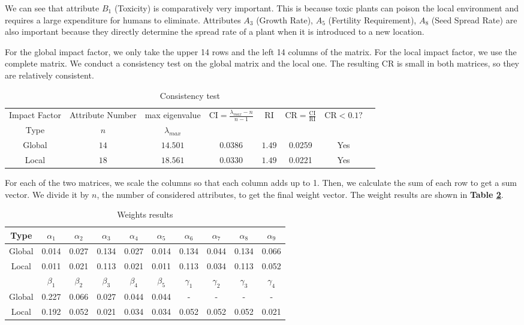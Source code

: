 \documentclass[12pt]{article}
\begin{document}
		We can see that attribute $B_1$ (Toxicity) is comparatively very important.  This is because toxic plants can poison the local environment and requires a large expenditure for humans to eliminate.  Attributes $A_3$ (Growth Rate), $A_5$ (Fertility Requirement), $A_8$ (Seed Spread Rate) are also important because they directly determine the spread rate of a plant when it is introduced to a new location.  
		
		For the global impact factor, we only take the upper 14 rows and the left 14 columns of the matrix.  For the local impact factor, we use the complete matrix.  We conduct a consistency test on the global matrix and the local one.  The resulting CR is small in both matrices, so they are relatively consistent.
		
		{
			\fontsize{10}{14}\selectfont
			{
				\begin{longtable}{cccccccc}
					\caption{Consistency test}
					\label{tb:consistency}\\
					
					\toprule
					Impact Factor&Attribute Number&max eigenvalue 
					&\multirow{2}{*}{$\mathrm{CI}=\frac{\lambda_{max}-n}{n-1}$}
					&\multirow{2}{*}{$\mathrm{RI}$}
					&\multirow{2}{*}{$\mathrm{CR}=\frac{\mathrm{CI}}{\mathrm{RI}}$}
					&\multirow{2}{*}{$\mathrm{CR}<0.1?$}\\
					Type&$n$&$\lambda_{max}$\\
					\toprule
					Global&$14$&$14.501$&$0.0386$&$1.49$&0.0259&Yes\\
					Local&$18$&$18.561$&$0.0330$&$1.49$&0.0221&Yes\\
					\bottomrule
				\end{longtable}
			}
		}	
		
		For each of the two matrices, we scale the columns so that each column adds up to 1.  Then, we calculate the sum of each row to get a sum vector.  We divide it by $n$, the number of considered attributes, to get the final weight vector.  The weight results are shown in \textbf{Table \ref{tb:weights}}.
	
		{
			\fontsize{10}{14}\selectfont
			{
				\begin{longtable}{c|ccccccccc}
					\caption{Weights results}
					\label{tb:weights}\\
					
					\toprule
					Type&$\alpha_1$&$\alpha_2$&$\alpha_3$&$\alpha_4$&$\alpha_5$&$\alpha_6$&$\alpha_7$&$\alpha_8$&$\alpha_9$\\
					\toprule
					Global&0.014&0.027&0.134&0.027&0.014&0.134&0.044&0.134&0.066\\
					Local&0.011&0.021&0.113&0.021&0.011&0.113&0.034&0.113&0.052\\
					\toprule
					\toprule
					&$\beta_1$&$\beta_2$&$\beta_3$&$\beta_4$&$\beta_5$&$\gamma_1$&$\gamma_2$&$\gamma_3$&$\gamma_4$\\
					\toprule
					Global&0.227&0.066&0.027&0.044&0.044&-&-&-&-\\
					Local&0.192&0.052&0.021&0.034&0.034&0.052&0.052&0.052&0.021\\
					\bottomrule
				\end{longtable}
			}
		}	
	
\end{document}
